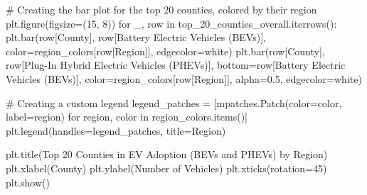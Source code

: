 \documentclass[
  letterpaper,
  DIV=11,
  numbers=noendperiod]{scrartcl}
\newenvironment{Shaded}{\begin{snugshade}}{\end{snugshade}}
\newcommand{\CommentTok}[1]{\textcolor[rgb]{0.37,0.37,0.37}{#1}}
\newcommand{\ControlFlowTok}[1]{\textcolor[rgb]{0.00,0.23,0.31}{#1}}
\newcommand{\DecValTok}[1]{\textcolor[rgb]{0.68,0.00,0.00}{#1}}
\newcommand{\FloatTok}[1]{\textcolor[rgb]{0.68,0.00,0.00}{#1}}
\newcommand{\KeywordTok}[1]{\textcolor[rgb]{0.00,0.23,0.31}{#1}}
\newcommand{\NormalTok}[1]{\textcolor[rgb]{0.00,0.23,0.31}{#1}}
\newcommand{\OperatorTok}[1]{\textcolor[rgb]{0.37,0.37,0.37}{#1}}
\newcommand{\StringTok}[1]{\textcolor[rgb]{0.13,0.47,0.30}{#1}}
\begin{document}
\begin{Shaded}
\begin{Highlighting}[]
\CommentTok{\# Creating the bar plot for the top 20 counties, colored by their region}
\NormalTok{plt.figure(figsize}\OperatorTok{=}\NormalTok{(}\DecValTok{15}\NormalTok{, }\DecValTok{8}\NormalTok{))}
\ControlFlowTok{for}\NormalTok{ \_, row }\KeywordTok{in}\NormalTok{ top\_20\_counties\_overall.iterrows():}
\NormalTok{    plt.bar(row[}\StringTok{\textquotesingle{}County\textquotesingle{}}\NormalTok{], row[}\StringTok{\textquotesingle{}Battery Electric Vehicles (BEVs)\textquotesingle{}}\NormalTok{], color}\OperatorTok{=}\NormalTok{region\_colors[row[}\StringTok{\textquotesingle{}Region\textquotesingle{}}\NormalTok{]], edgecolor}\OperatorTok{=}\StringTok{\textquotesingle{}white\textquotesingle{}}\NormalTok{)}
\NormalTok{    plt.bar(row[}\StringTok{\textquotesingle{}County\textquotesingle{}}\NormalTok{], row[}\StringTok{\textquotesingle{}Plug{-}In Hybrid Electric Vehicles (PHEVs)\textquotesingle{}}\NormalTok{], bottom}\OperatorTok{=}\NormalTok{row[}\StringTok{\textquotesingle{}Battery Electric Vehicles (BEVs)\textquotesingle{}}\NormalTok{], color}\OperatorTok{=}\NormalTok{region\_colors[row[}\StringTok{\textquotesingle{}Region\textquotesingle{}}\NormalTok{]], alpha}\OperatorTok{=}\FloatTok{0.5}\NormalTok{, edgecolor}\OperatorTok{=}\StringTok{\textquotesingle{}white\textquotesingle{}}\NormalTok{)}

\CommentTok{\# Creating a custom legend}
\NormalTok{legend\_patches }\OperatorTok{=}\NormalTok{ [mpatches.Patch(color}\OperatorTok{=}\NormalTok{color, label}\OperatorTok{=}\NormalTok{region) }\ControlFlowTok{for}\NormalTok{ region, color }\KeywordTok{in}\NormalTok{ region\_colors.items()]}
\NormalTok{plt.legend(handles}\OperatorTok{=}\NormalTok{legend\_patches, title}\OperatorTok{=}\StringTok{\textquotesingle{}Region\textquotesingle{}}\NormalTok{)}

\NormalTok{plt.title(}\StringTok{\textquotesingle{}Top 20 Counties in EV Adoption (BEVs and PHEVs) by Region\textquotesingle{}}\NormalTok{)}
\NormalTok{plt.xlabel(}\StringTok{\textquotesingle{}County\textquotesingle{}}\NormalTok{)}
\NormalTok{plt.ylabel(}\StringTok{\textquotesingle{}Number of Vehicles\textquotesingle{}}\NormalTok{)}
\NormalTok{plt.xticks(rotation}\OperatorTok{=}\DecValTok{45}\NormalTok{)}
\NormalTok{plt.show()}
\end{Highlighting}
\end{Shaded}
\end{document}
